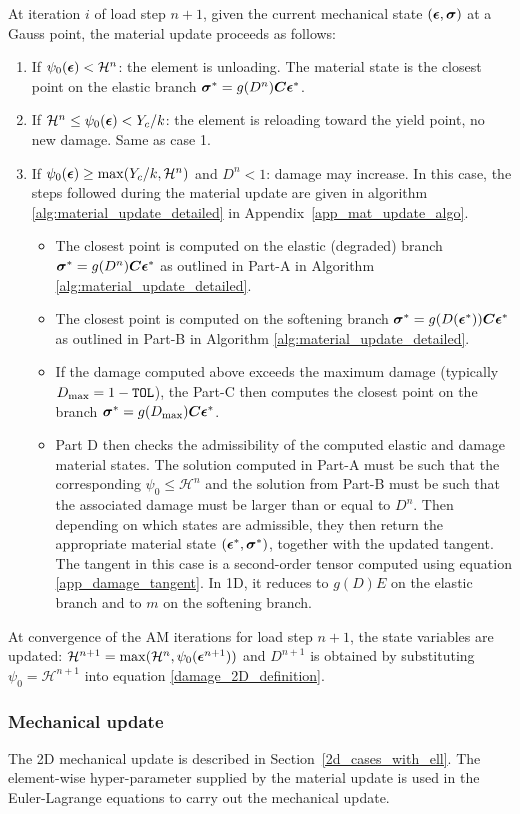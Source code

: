 \documentclass[10pt]{cas-sc}
\newenvironment{addedblock}
{\begingroup\color{blue!80}}
{\endgroup}
\begin{document}
\begin{addedblock}
At iteration $i$ of load step $n+1$, given the current mechanical state $(\mbox{\boldmath $\epsilon$},\mbox{\boldmath $\sigma$})$ at a Gauss point, the material update proceeds as follows:
\begin{enumerate}
	\item If $\psi_0(\mbox{\boldmath $\epsilon$}) < \mathcal{H}^n$: the element is unloading. The material state is the closest point on the elastic branch $\mbox{\boldmath $\sigma$}^* = g(D^n) \mbox{\boldmath $C$} \mbox{\boldmath $\epsilon$}^*$.
	\item If $\mathcal{H}^n \leq \psi_0(\mbox{\boldmath $\epsilon$}) < Y_c/k$: the element is reloading toward the yield point, no new damage. Same as case 1.
	\item If $\psi_0(\mbox{\boldmath $\epsilon$}) \geq \max(Y_c/k,\mathcal{H}^n)$ and $D^n < 1$: damage may increase. In this case, the steps followed during the material update are given in algorithm \ref{alg:material_update_detailed} in Appendix~\ref{app_mat_update_algo}. 
	\begin{itemize}
		\item The closest point is computed on the elastic (degraded) branch $\mbox{\boldmath $\sigma$}^* = g(D^n) \mbox{\boldmath $C$} \mbox{\boldmath $\epsilon$}^*$ as outlined in Part-A in Algorithm \ref{alg:material_update_detailed}. 
		\item The closest point is computed on the softening branch $\mbox{\boldmath $\sigma$}^* = g(D(\mbox{\boldmath $\epsilon$}^*)) \mbox{\boldmath $C$} \mbox{\boldmath $\epsilon$}^*$ as outlined in Part-B in Algorithm \ref{alg:material_update_detailed}.
		\item If the damage computed above exceeds the maximum damage (typically $D_{\rm max}=1-\texttt{TOL}$), the Part-C then computes the closest point on the branch $\mbox{\boldmath $\sigma$}^* = g(D_{\rm max}) \mbox{\boldmath $C$} \mbox{\boldmath $\epsilon$}^*$. 
		\item Part D then checks the admissibility of the computed elastic and damage material states. The solution computed in Part-A must be such that the corresponding $\psi_0 \leq \mathcal{H}^n$ and the solution from Part-B must be such that the associated damage must be larger than or equal to $D^n$. Then depending on which states are admissible, they then return the appropriate material state $(\mbox{\boldmath $\epsilon$}^*, \mbox{\boldmath $\sigma$} ^*)$, together with the updated tangent. The tangent in this case is a second-order tensor computed using equation \ref{app_damage_tangent}. In 1D, it reduces to $g(D)E$ on the elastic branch and to $m$ on the softening branch.
	\end{itemize}
\end{enumerate}


At convergence of the AM iterations for load step $n+1$, the state variables are updated: $\mathcal{H}^{n+1} = \max(\mathcal{H}^n, \psi_0(\mbox{\boldmath $\epsilon$}^{n+1}))$ and  $D^{n+1}$ is obtained by substituting $\psi_0 = \mathcal{H}^{n+1}$ into equation \ref{damage_2D_definition}.

\subsubsection*{Mechanical update}
The 2D mechanical update is described in Section~\ref{2d_cases_with_ell}. The element-wise hyper-parameter supplied by the material update is used in the Euler-Lagrange equations to carry out the mechanical update.
\end{addedblock}
\end{document}
